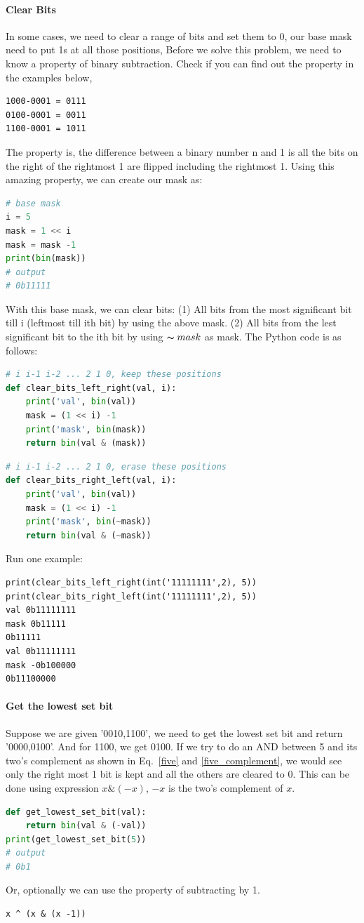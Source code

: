 \documentclass[../main.tex]{subfiles}
\begin{document}
\paragraph{Clear Bits} In some cases, we need to clear a range of bits and set them to 0, our base mask need to put 1s at all those positions, Before we solve this problem, we need to know a property of binary subtraction. Check if you can find out the property in the examples below,
\begin{lstlisting}[numbers=none]
1000-0001 = 0111
0100-0001 = 0011
1100-0001 = 1011
\end{lstlisting}

The property is, the difference between a binary number n and 1 is all the bits on the right of the rightmost 1 are flipped including the rightmost 1. Using this amazing property, we can create our mask as:
\begin{lstlisting}[language=Python]
# base mask
i = 5
mask = 1 << i
mask = mask -1
print(bin(mask))
# output
# 0b11111
\end{lstlisting}
With this base mask, we can clear bits: (1) All bits from the most significant bit till i (leftmost till ith bit) by using the above mask. (2) All bits from the lest significant bit to the ith bit by using $\thicksim mask$ as mask. The Python code is as follows:
\begin{lstlisting}[language=Python]
# i i-1 i-2 ... 2 1 0, keep these positions
def clear_bits_left_right(val, i):
    print('val', bin(val))
    mask = (1 << i) -1
    print('mask', bin(mask))
    return bin(val & (mask))
\end{lstlisting}
\begin{lstlisting}[language=Python]
# i i-1 i-2 ... 2 1 0, erase these positions
def clear_bits_right_left(val, i):
    print('val', bin(val))
    mask = (1 << i) -1
    print('mask', bin(~mask))
    return bin(val & (~mask))
\end{lstlisting}
Run one example:
\begin{lstlisting}[numbers=none]
print(clear_bits_left_right(int('11111111',2), 5))
print(clear_bits_right_left(int('11111111',2), 5))
val 0b11111111
mask 0b11111
0b11111
val 0b11111111
mask -0b100000
0b11100000
\end{lstlisting}
\paragraph{Get the lowest set bit } Suppose we are given '0010,1100', we need to get the lowest set bit and return '0000,0100'. And for 1100, we get 0100.  If we try to do an AND between 5 and its two's complement as shown in Eq.~\ref{five} and \ref{five_complement}, we would see only the right most 1 bit is kept and all the others are cleared to 0. This can be done using expression $x \&(-x)$, $-x$ is the two's complement of $x$.
\begin{lstlisting}[language=Python]
def get_lowest_set_bit(val):
    return bin(val & (-val))
print(get_lowest_set_bit(5))
# output
# 0b1
\end{lstlisting}
Or, optionally we can use the property of subtracting by 1. 
\begin{lstlisting}
x ^ (x & (x -1))
\end{lstlisting}
\end{document}
